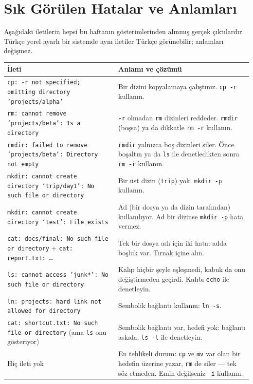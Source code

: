 \documentclass[11pt,a4paper]{article}
\newcommand{\cmd}[1]{\texttt{#1}}
\begin{document}
\section{Sık Görülen Hatalar ve Anlamları}

Aşağıdaki iletilerin hepsi bu haftanın gösterimlerinden alınmış gerçek çıktılardır. Türkçe yerel ayarlı bir sistemde aynı iletiler Türkçe görünebilir; anlamları değişmez.

{\small
\renewcommand{\arraystretch}{1.25}
\begin{longtable}{@{}>{\raggedright\arraybackslash}p{6.9cm} >{\raggedright\arraybackslash}p{7.6cm}@{}}
\toprule
\textbf{İleti} & \textbf{Anlamı ve çözümü} \\
\midrule
\endhead
\texttt{cp: -r not specified; omitting directory 'projects/alpha'} & Bir dizini kopyalamaya çalıştınız. \cmd{cp -r} kullanın. \\
\texttt{rm: cannot remove 'projects/beta': Is a directory} & \cmd{-r} olmadan \cmd{rm} dizinleri reddeder. \cmd{rmdir} (boşsa) ya da dikkatle \cmd{rm -r} kullanın. \\
\texttt{rmdir: failed to remove 'projects/beta': Directory not empty} & \cmd{rmdir} yalnızca boş dizinleri siler. Önce boşaltın ya da \cmd{ls} ile denetledikten sonra \cmd{rm -r} kullanın. \\
\texttt{mkdir: cannot create directory ‘trip/day1’: No such file or directory} & Bir üst dizin (\texttt{trip}) yok. \cmd{mkdir -p} kullanın. \\
\texttt{mkdir: cannot create directory ‘test’: File exists} & Ad (bir dosya ya da dizin tarafından) kullanılıyor. Ad bir dizinse \cmd{mkdir -p} hata vermez. \\
\texttt{cat: docs/final: No such file or directory} + \texttt{cat: report.txt: \dots} & Tek bir dosya adı için iki hata: adda boşluk var. Tırnak içine alın. \\
\texttt{ls: cannot access 'junk*': No such file or directory} & Kalıp hiçbir şeyle eşleşmedi, kabuk da onu değiştirmeden geçirdi. Kalıbı \cmd{echo} ile denetleyin. \\
\texttt{ln: projects: hard link not allowed for directory} & Sembolik bağlantı kullanın: \cmd{ln -s}. \\
\texttt{cat: shortcut.txt: No such file or directory} (ama \cmd{ls} onu gösteriyor) & Sembolik bağlantı var, hedefi yok: bağlantı askıda. \cmd{ls -l} ile denetleyin. \\
Hiç ileti yok & En tehlikeli durum: \cmd{cp} ve \cmd{mv} var olan bir hedefin üzerine yazar, \cmd{rm} de siler --- tek söz etmeden. Emin değilseniz \cmd{-i} kullanın. \\
\bottomrule
\end{longtable}
}
\end{document}
